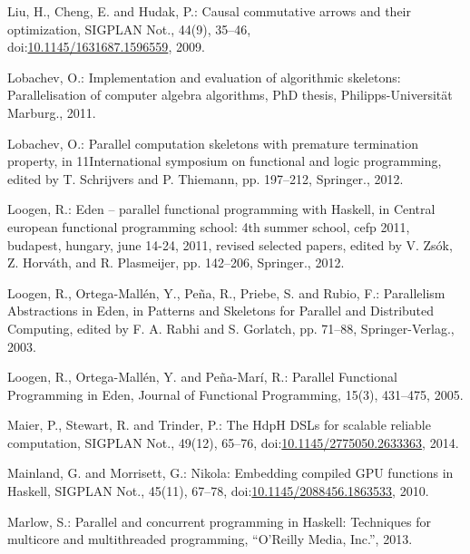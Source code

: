 \documentclass[paper=A4,twoside=true,openright,parskip=full,chapterprefix=true,headings=normal,bibliography=totoc,listof=totoc,titlepage=on,captions=tableabove,draft=false,british]{scrreprt}%
\begin{document}
\leavevmode\hypertarget{ref-Liu:2009:CCA:1631687.1596559}{}%
Liu, H., Cheng, E. and Hudak, P.: Causal commutative arrows and their
optimization, SIGPLAN Not., 44(9), 35--46,\\
doi:\href{https://doi.org/10.1145/1631687.1596559}{10.1145/1631687.1596559},
2009.

\leavevmode\hypertarget{ref-lobachev-phd}{}%
Lobachev, O.: Implementation and evaluation of algorithmic skeletons:
Parallelisation of computer algebra algorithms, PhD thesis,
Philipps-Universität Marburg., 2011.

\leavevmode\hypertarget{ref-Lobachev2012}{}%
Lobachev, O.: Parallel computation skeletons with premature termination
property, in 11International symposium on functional and logic
programming, edited by T. Schrijvers and P. Thiemann, pp. 197--212,
Springer., 2012.

\leavevmode\hypertarget{ref-Loogen2012}{}%
Loogen, R.: Eden -- parallel functional programming with Haskell, in
Central european functional programming school: 4th summer school, cefp
2011, budapest, hungary, june 14-24, 2011, revised selected papers,
edited by V. Zsók, Z. Horváth, and R. Plasmeijer, pp. 142--206,
Springer., 2012.

\leavevmode\hypertarget{ref-Eden:SkeletonBookChapter02}{}%
Loogen, R., Ortega-Mallén, Y., Peña, R., Priebe, S. and Rubio, F.:
Parallelism Abstractions in Eden, in Patterns and Skeletons for Parallel
and Distributed Computing, edited by F. A. Rabhi and S. Gorlatch, pp.
71--88, Springer-Verlag., 2003.

\leavevmode\hypertarget{ref-eden}{}%
Loogen, R., Ortega-Mallén, Y. and Peña-Marí, R.: Parallel Functional
Programming in Eden, Journal of Functional Programming, 15(3), 431--475,
2005.

\leavevmode\hypertarget{ref-Maier:2014:HDS:2775050.2633363}{}%
Maier, P., Stewart, R. and Trinder, P.: The HdpH DSLs for scalable
reliable computation, SIGPLAN Not., 49(12), 65--76,
doi:\href{https://doi.org/10.1145/2775050.2633363}{10.1145/2775050.2633363},
2014.

\leavevmode\hypertarget{ref-Mainland:2010:NEC:2088456.1863533}{}%
Mainland, G. and Morrisett, G.: Nikola: Embedding compiled GPU functions
in Haskell, SIGPLAN Not., 45(11), 67--78,
doi:\href{https://doi.org/10.1145/2088456.1863533}{10.1145/2088456.1863533},
2010.

\leavevmode\hypertarget{ref-marlow2013parallel}{}%
Marlow, S.: Parallel and concurrent programming in Haskell: Techniques
for multicore and multithreaded programming, ``O'Reilly Media, Inc.'',
2013.
\end{document}
